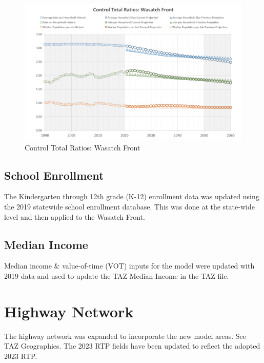 \documentclass[
  letterpaper,
  DIV=11,
  numbers=noendperiod]{scrreprt}
\begin{document}
\begin{figure}[H]

{\centering \includegraphics{v9x/v900/whats-new/_pictures/pdf-ratio-control.png}

}

\caption{\label{fig-pdf-bus-rat-control}Control Total Ratios: Wasatch
Front}

\end{figure}

\hypertarget{school-enrollment}{%
\subsection{School Enrollment}\label{school-enrollment}}

The Kindergarten through 12th grade (K-12) enrollment data was updated
using the 2019 statewide school enrollment database. This was done at
the state-wide level and then applied to the Wasatch Front.

\hypertarget{median-income}{%
\subsection{Median Income}\label{median-income}}

Median income \& value-of-time (VOT) inputs for the model were updated
with 2019 data and used to update the TAZ Median Income in the TAZ file.

\hypertarget{highway-network}{%
\section{Highway Network}\label{highway-network}}

The highway network was expanded to incorporate the new model areas. See
TAZ Geographies. The 2023 RTP fields have been updated to reflect the
adopted 2023 RTP.
\end{document}
